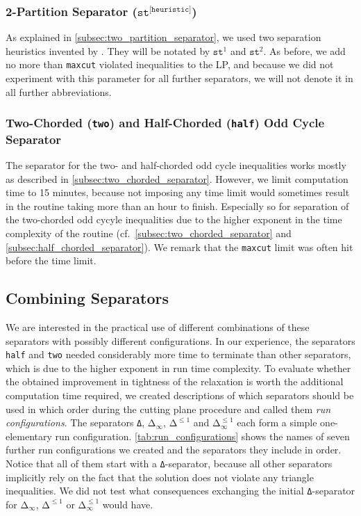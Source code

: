 \subsubsection{2-Partition Separator (\texorpdfstring{$\texttt{st}^{\texttt{[heuristic]}}$}{Δ})}
As explained in \cref{subsec:two_partition_separator}, we used two separation heuristics invented by \cite{grotschelCuttingPlaneAlgorithm1989}.
They will be notated by $\texttt{st}^{1}$ and $\texttt{st}^{2}$.
As before, we add no more than \texttt{maxcut} violated inequalities to the LP, and because we did not experiment with this parameter for all further separators, we will not denote it in all further abbreviations.

\subsubsection{Two-Chorded (\texttt{two}) and Half-Chorded (\texttt{half}) Odd Cycle Separator}
The separator for the two- and half-chorded odd cycle inequalities works mostly as described in \cref{subsec:two_chorded_separator}.
However, we limit computation time to 15 minutes, because not imposing any time limit would sometimes result in the routine taking more than an hour to finish.
Especially so for separation of the two-chorded odd cycyle inequalities due to the higher exponent in the time complexity of the routine (cf.\ \cref{subsec:two_chorded_separator} and \cref{subsec:half_chorded_separator}).
We remark that the \texttt{maxcut} limit was often hit before the time limit.

\subsection{Combining Separators}\label{subsec:run_configurations}
We are interested in the practical use of different combinations of these separators with possibly different configurations.
In our experience, the separators \texttt{half} and \texttt{two} needed considerably more time to terminate than other separators, which is due to the higher exponent in run time complexity.
To evaluate whether the obtained improvement in tightness of the relaxation is worth the additional computation time required,
we created descriptions of which separators should be used in which order during the cutting plane procedure and called them \textit{run configurations}.
The separators \texttt{Δ}, $\texttt{Δ}_{\infty}$, $\texttt{Δ}^{\leq 1}$ and $\texttt{Δ}_{\infty}^{\leq 1}$ each form a simple one-elementary run configuration.
\cref{tab:run_configurations} shows the names of seven further run configurations we created and the separators they include in order.
Notice that all of them start with a \texttt{Δ}-separator, because all other separators implicitly rely on the fact that the solution does not violate any triangle inequalities.
We did not test what consequences exchanging the initial \texttt{Δ}-separator for $\texttt{Δ}_{\infty}$, $\texttt{Δ}^{\leq 1}$ or $\texttt{Δ}_{\infty}^{\leq 1}$ would have.

